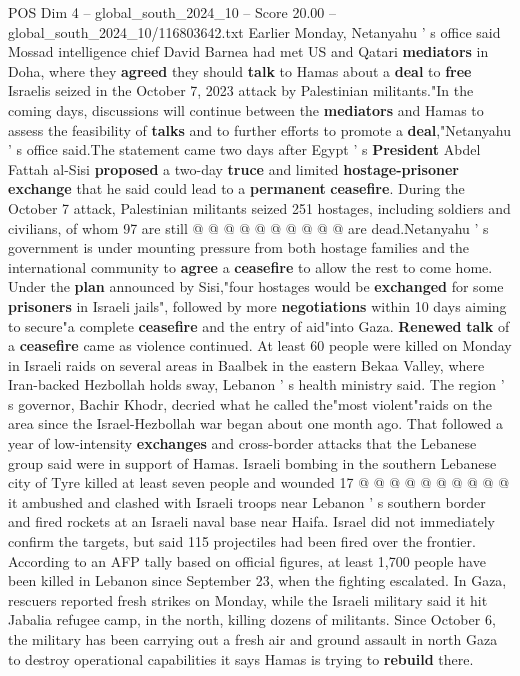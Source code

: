 \begin{textsample}{POS Dim 4 – global\_south\_2024\_10 – Score 20.00 – global\_south\_2024\_10/116803642.txt}
Earlier Monday, Netanyahu ' s office said Mossad intelligence chief David Barnea had met US and Qatari \textbf{mediators} in Doha, where they \textbf{agreed} they should \textbf{talk} to Hamas about a \textbf{deal} to \textbf{free} Israelis seized in the October 7, 2023 attack by Palestinian militants."In the coming days, discussions will continue between the \textbf{mediators} and Hamas to assess the feasibility of \textbf{talks} and to further efforts to promote a \textbf{deal},"Netanyahu ' s office said.The statement came two days after Egypt ' s \textbf{President} Abdel Fattah al-Sisi \textbf{proposed} a two-day \textbf{truce} and limited \textbf{hostage-prisoner} \textbf{exchange} that he said could lead to a \textbf{permanent} \textbf{ceasefire}.
During the October 7 attack, Palestinian militants seized 251 hostages, including soldiers and civilians, of whom 97 are still @ @ @ @ @ @ @ @ @ @ are dead.Netanyahu ' s government is under mounting pressure from both hostage families and the international community to \textbf{agree} a \textbf{ceasefire} to allow the rest to come home.
Under the \textbf{plan} announced by Sisi,"four hostages would be \textbf{exchanged} for some \textbf{prisoners} in Israeli jails", followed by more \textbf{negotiations} within 10 days aiming to secure"a complete \textbf{ceasefire} and the entry of aid"into Gaza. \textbf{Renewed} \textbf{talk} of a \textbf{ceasefire} came as violence continued.
At least 60 people were killed on Monday in Israeli raids on several areas in Baalbek in the eastern Bekaa Valley, where Iran-backed Hezbollah holds sway, Lebanon ' s health ministry said.
The region ' s governor, Bachir Khodr, decried what he called the"most violent"raids on the area since the Israel-Hezbollah war began about one month ago.
That followed a year of low-intensity \textbf{exchanges} and cross-border attacks that the Lebanese group said were in support of Hamas.
Israeli bombing in the southern Lebanese city of Tyre killed at least seven people and wounded 17 @ @ @ @ @ @ @ @ @ @ it ambushed and clashed with Israeli troops near Lebanon ' s southern border and fired rockets at an Israeli naval base near Haifa.
Israel did not immediately confirm the targets, but said 115 projectiles had been fired over the frontier.
According to an AFP tally based on official figures, at least 1,700 people have been killed in Lebanon since September 23, when the fighting escalated.
In Gaza, rescuers reported fresh strikes on Monday, while the Israeli military said it hit Jabalia refugee camp, in the north, killing dozens of militants.
Since October 6, the military has been carrying out a fresh air and ground assault in north Gaza to destroy operational capabilities it says Hamas is trying to \textbf{rebuild} there.

\end{textsample}
